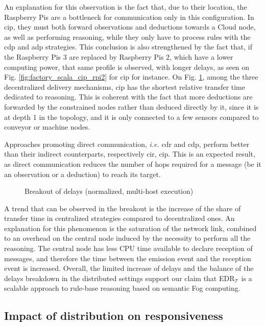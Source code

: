 \documentclass{iosart2c}
\newcommand{\edrt}{EDR$_{\mathcal{T}}$\xspace}
\begin{document}
An explanation for this observation is the fact that, due to their location, the Raspberry Pis are a bottleneck for communication only in this configuration. 
In \gls{cip}, they must both forward observations and deductions towards a Cloud node, as well as performing reasoning, while they only have to process rules with the \gls{cdp} and \gls{adp} strategies.
This conclusion is also strengthened by the fact that, if the Raspberry Pis 3 are replaced by Raspberry Pis 2, which have a lower computing power, that same profile is observed, with longer delays, as seen on Fig. \ref{fig:factory_scala_cip_rpi2} for \gls{cip} for instance.
On Fig. \ref{fig:breakout_delays_rpi}, among the three decentralized delivery mechanisms, \gls{cip} has the shortest relative transfer time dedicated to reasoning.
This is coherent with the fact that more deductions are forwarded by the constrained nodes rather than deduced directly by it, since it is at depth 1 in the topology, and it is only connected to a few sensors compared to conveyor or machine nodes.

Approaches promoting direct communication, \textit{i.e.} \gls{cdr} and \gls{cdp}, perform better than their indirect counterparts, respectively \gls{cir}, \gls{cip}.
This is an expected result, as direct communication reduces the number of hops required for a message (be it an observation or a deduction) to reach its target.

\begin{figure}
	\caption{Breakout of delays (normalized, multi-host execution)}
	\label{fig:breakout_delays_rpi}
	\scalebox{0.75}{
		
	}
\end{figure}

A trend that can be observed in the breakout is the increase of the share of transfer time in centralized strategies compared to decentralized ones. 
An explanation for this phenomenon is the saturation of the network link, combined to an overhead on the central node induced by the necessity to perform all the reasoning. 
The central node has less CPU time available to declare reception of messages, and therefore the time between the emission event and the reception event is increased.
Overall, the limited increase of delays and the balance of the delays breakdown in the distributed settings support our claim that \edrt is a scalable approach to rule-base reasoning based on semantic Fog computing.

\subsection{Impact of distribution on responsiveness}
\label{subs:factory_distribution}
\end{document}
